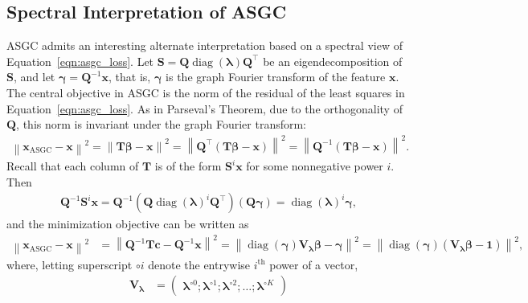 \documentclass{article}
\newcommand{\norm}[1]{\left\lVert#1\right\rVert}
\DeclareMathOperator{\diag}{diag}
\begin{document}
\subsection{Spectral Interpretation of ASGC}\label{app:interpret}
%
ASGC admits an interesting alternate interpretation based on a spectral view of Equation~\ref{eqn:asgc_loss}.
Let $\bm{S} = \bm{Q} \diag(\bm{\lambda}) \bm{Q}^\top$ be an eigendecomposition of $\bm{S}$, and let $\bm{\gamma} = \bm{Q}^{-1} \bm{x}$, that is, $\bm{\gamma}$ is the graph Fourier transform of the feature $\bm{x}$. The central objective in ASGC is the norm of the residual of the least squares in Equation~\ref{eqn:asgc_loss}. As in Parseval's Theorem, due to the orthogonality of $\bm{Q}$, this norm is invariant under the graph Fourier transform:
%
\begin{align*}
    \norm{\bm{x}_\text{ASGC} - \bm{x}}^2 
    = \norm{\bm{T}\bm{\beta} - \bm{x}}^2
    = \norm{\bm{Q}^{\top} \left(\bm{T}\bm{\beta} - \bm{x}\right)}^2
    = \norm{\bm{Q}^{-1} \left(\bm{T}\bm{\beta} - \bm{x}\right)}^2 .
\end{align*}
%
Recall that each column of $\bm{T}$ is of the form $\bm{S}^i \bm{x}$ for some nonnegative power $i$. Then
%
\begin{align*}
    \bm{Q}^{-1} \bm{S}^i \bm{x}
    = \bm{Q}^{-1} \left( \bm{Q} \diag(\bm{\lambda})^i \bm{Q}^\top \right) \left( \bm{Q} \bm{\gamma} \right)
    = \diag(\bm{\lambda})^i \bm{\gamma},
\end{align*}
%
and the minimization objective can be written as
%
\begin{align*}
    \norm{\bm{x}_\text{ASGC} - \bm{x}}^2 
    &= \norm{\bm{Q}^{-1} \bm{T}\bm{c} - \bm{Q}^{-1}\bm{x}}^2
    = \norm{\diag(\bm{\gamma}) \bm{V_\lambda} \bm{\beta} - \bm{\gamma}}^2
    = \norm{\diag(\bm{\gamma}) \left(\bm{V_\lambda} \bm{\beta} - \bm{1} \right)}^2 ,
\end{align*}
%
%
where, letting superscript $\circ i$ denote the entrywise $i^\text{th}$ power of a vector,
\begin{align*}
    \bm{V_\lambda} &= 
    \begin{pmatrix}
    \bm{\lambda}^{\circ 0}; \bm{\lambda}^{\circ 1}; \bm{\lambda}^{\circ 2}; \dots; \bm{\lambda}^{\circ K}
    \end{pmatrix}
\end{align*}
%
\end{document}
